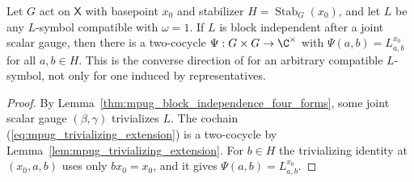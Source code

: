 \begin{lemma}
    \label{lem:mpug_bi_basepoint_extension}
    \leanok
    Let $G$ act on $\mathsf X$ with basepoint $x_0$ and stabilizer
    $H=\operatorname{Stab}_G(x_0)$, and let $L$ be any $L$-symbol compatible
    with $\omega=1$. If $L$ is block independent after a joint scalar gauge,
    then there is a two-cocycle $\Psi:G\times G\to\C^\times$ with
    $\Psi(a,b)=L^{x_0}_{a,b}$ for all $a,b\in H$. This is the converse
    direction of \cite[lines~7057--7064]{FrancoRubio2025MPUGauging} for an
    arbitrary compatible $L$-symbol, not only for one induced by
    representatives.
\end{lemma}

\begin{proof}\leanok
    By Lemma~\ref{thm:mpug_block_independence_four_forms}, some joint scalar
    gauge $(\beta,\gamma)$ trivializes $L$. The cochain
    (\ref{eq:mpug_trivializing_extension}) is a two-cocycle by
    Lemma~\ref{lem:mpug_trivializing_extension}. For $b\in H$ the trivializing
    identity at $(x_0,a,b)$ uses only $bx_0=x_0$, and it gives
    $\Psi(a,b)=L^{x_0}_{a,b}$.
\end{proof}

